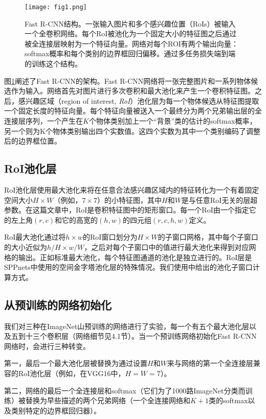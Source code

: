 \documentclass[../main]{subfile}
\begin{document}
\begin{figure}[bh]
    \centering
    \texttt{[image: fig1.png]}
    \caption{Fast R-CNN结构。一张输入图片和多个感兴趣位置（RoIs）被输入一个全卷积网络。每个RoI被池化为一个固定大小的特征图之后通过被全连接层映射为一个特征向量。网络对每个ROI有两个输出向量：softmax概率和每个类别的边界框回归偏移。通过多任务损失端到端的训练这个结构。}
    \label{fig:img1}
\end{figure}

图\ref{fig:img1}阐述了Fast R-CNN的架构。Fast R-CNN网络将一张完整图片和一系列物体候选作为输入。网络首先对图片进行多次卷积和最大池化来产生一个卷积特征图。之后，感兴趣区域（region of interest, \textit{RoI}）池化层为每一个物体候选从特征图提取一个固定长度的特征向量。每个特征向量被送入一个最终分为两个兄弟输出层的全连接层序列，一个产生在$K$个物体类别加上一个“背景”类的估计的softmax概率，另一个则为K个物体类别输出四个实数值。这四个实数为其中一个类别编码了调整后的边界框位置。

\subsection{RoI池化层}

RoI池化层使用最大池化来将在任意合法感兴趣区域内的特征转化为一个有着固定空间大小$H\times W$（例如，$7\times 7$）的小特征图，其中$H$和$W$是与任意RoI无关的层超参数。在这篇文章中，RoI是卷积特征图中的矩形窗口。每一个RoI由一个指定它的左上角$(r, c)$和它的高宽的$(h, w)$的四元组$(r, c, h, w)$定义。

RoI最大池化通过将$h \times w$的RoI窗口划分为$H \times W$的子窗口网格，其中每个子窗口的大小近似为$h/H \times w/W$，之后对每个子窗口中的值进行最大池化来得到对应网格的输出。正如标准最大池化，每个特征图通道的池化是独立进行的。RoI层是SPPnets\cite{spp}中使用的空间金字塔池化层的特殊情况。我们使用\cite{spp}中给出的池化子窗口计算方式。

\subsection{从预训练的网络初始化}

我们对三种在ImageNet山预训练的网络进行了实验，每一个有五个最大池化层以及五到十三个卷积层（网络细节见4.1节）。当一个预训练网络初始化Fast R-CNN网络时，会进行三种转变。

第一，最后一个最大池化层被替换为通过设置$H$和$W$来与网络的第一个全连接层兼容的RoI池化层（例如，在VGG16中，$H=W=7$）。

第二，网络的最后一个全连接层和softmax（它们为了1000路ImageNet分类而训练）被替换为早些描述的两个兄弟网络（一个全连接网络和$K+1$类的softmax以及类别特定的边界框回归器）。
\end{document}
